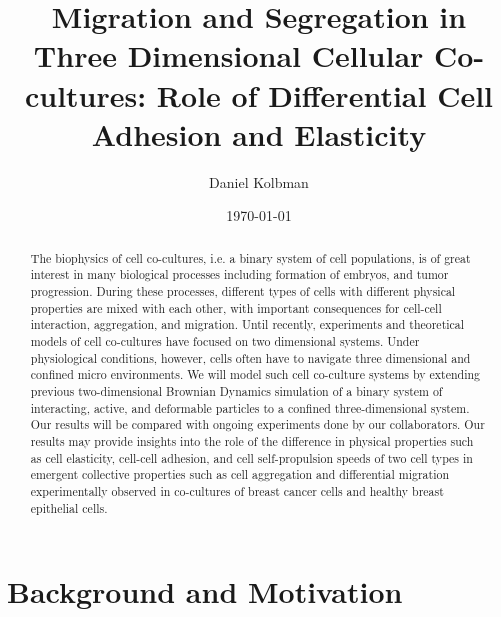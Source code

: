 \documentclass[aps,prb,twocolumn,groupedaddress,nofootinbib,floatfix]{revtex4}
\begin{document}
%
\title{Migration and Segregation in Three Dimensional Cellular Co-cultures: Role of
Differential Cell Adhesion and Elasticity}

%
\author{Daniel Kolbman}
%
%
%

\date{\today}

\begin{abstract} \noindent The biophysics of cell co-cultures, i.e. a binary system of cell populations, is of great interest in many biological processes including formation of embryos, and tumor progression. 
During these processes, different types of cells with different physical properties are mixed with each other, with important consequences for cell-cell interaction, aggregation, and migration. 
Until recently, experiments and theoretical models of cell co-cultures have focused on two dimensional systems. Under physiological conditions, however, cells often have to  
navigate three dimensional and confined micro environments. We will model such cell co-culture systems by extending previous two-dimensional Brownian Dynamics simulation of a binary system of interacting, 
active, and deformable particles to a confined three-dimensional system. Our results will be compared with ongoing experiments done by our collaborators. Our results may 
provide insights into the role of the difference in physical properties such as cell elasticity, cell-cell adhesion, and cell self-propulsion speeds of two cell types in emergent collective properties 
such as cell aggregation and differential migration experimentally observed in co-cultures of breast cancer cells and healthy breast epithelial cells.  

\end{abstract}

\maketitle

\section*{Background and Motivation}
\end{document}
